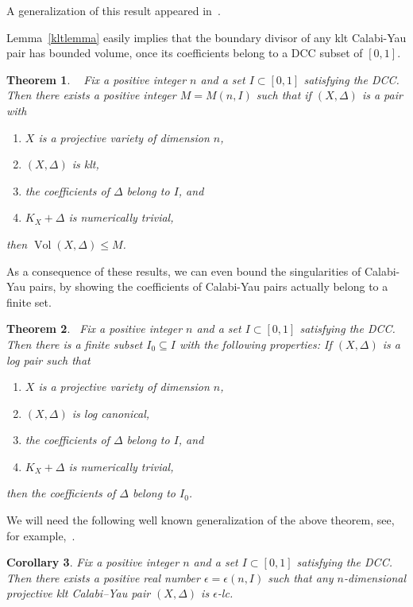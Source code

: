 \documentclass{amsart}[12pt,a4paper]
\newtheorem{theorem}{Theorem}[section]
\newtheorem{corollary}[theorem]{Corollary}
\theoremstyle{definition}
\DeclareMathOperator{\Vol}{\mathrm{Vol}}
\begin{document}
A generalization of this result appeared in~\cite[Lemma~4.3]{rccy3}.

Lemma~\ref{kltlemma} easily implies that the boundary divisor of any klt Calabi-Yau pair has bounded volume,
once its coefficients belong to a DCC subset of $[0,1]$.

\begin{theorem}
~\cite[Theorem~B]{HMX14}
\label{bound}
	Fix a positive integer $n$ and a set $I \subset [0,1]$ satisfying the DCC. Then there exists a positive integer $M=M(n, I)$ such that if $(X,\Delta)$ is a pair with 
	\begin{enumerate}
		\item $X$ is a projective variety of dimension $n$,
		\item $(X, \Delta)$ is klt, 
		\item the coefficients of $\Delta$ belong to $I$, and
		\item $K_X+\Delta$ is numerically trivial,
	\end{enumerate}
	then $\Vol(X,\Delta)\leq M$.
\end{theorem}

As a consequence of these results, we can even bound the singularities of Calabi-Yau pairs, by showing the coefficients of Calabi-Yau pairs actually belong to a finite set.

\begin{theorem}~\cite[Theorem~1.5]{HMX14}\label{hmx_1.5.thm}
	Fix a positive integer $n$ and a set $I \subset [0,1]$ satisfying 
	the DCC. Then there is a finite subset $I_0 \subseteq I$ with the following properties: \newline
	If $(X, \Delta)$ is a log pair such that
	\begin{enumerate}
		\item $X$ is a projective variety of dimension $n$,
		\item $(X, \Delta)$ is log canonical, 
		\item the coefficients of $\Delta$ belong to $I$, and
		\item $K_X+\Delta$ is numerically trivial,
	\end{enumerate}
	then the coefficients of $\Delta$ belong to $I_0$.
\end{theorem}

We will need the following well known generalization of the above theorem, see, for example,~\cite[Lemma~2.48]{bab16a}. 

\begin{corollary}
\label{elc}
Fix a positive integer $n$ and a set $I \subset [0,1]$ satisfying the DCC. 
Then there exists a positive real number $\epsilon=\epsilon(n, I)$ such that any $n$-dimensional projective klt Calabi--Yau pair $(X,\Delta)$ is $\epsilon$-lc. 
\end{corollary}
\end{document}
